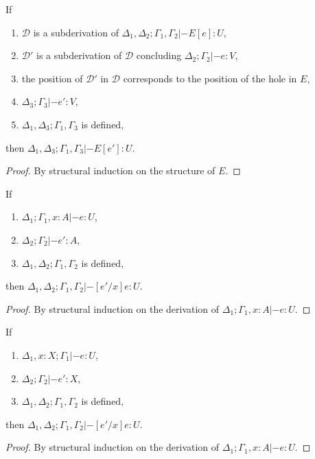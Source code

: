\begin{lemma}
  If
  \begin{enumerate}
  \item $\mathcal{D}$ is a subderivation of $\Delta_1,\Delta_2;\Gamma_1,\Gamma_2 |- E[e] : U$,
  \item $\mathcal{D}'$ is a subderivation of $\mathcal{D}$ concluding $\Delta_2;
    \Gamma_2 |- e : V$,
  \item the position of $\mathcal{D}'$ in $\mathcal{D}$ corresponds to the
    position of the hole in $E$,
  \item $\Delta_3;\Gamma_3 |- e' : V$,
  \item $\Delta_1,\Delta_3;\Gamma_1,\Gamma_3$ is defined,
  \end{enumerate}
  then $\Delta_1,\Delta_3;\Gamma_1,\Gamma_3 |- E[e'] : U$.
  \begin{proof}
    By structural induction on the structure of $E$.
  \end{proof}  
\end{lemma}

\begin{lemma}
  If
  \begin{enumerate}
  \item $\Delta_1; \Gamma_1, x : A |- e : U$,
  \item $\Delta_2; \Gamma_2 |- e' : A$,
  \item $\Delta_1,\Delta_2 ; \Gamma_1,\Gamma_2$ is defined,
  \end{enumerate}
  then $\Delta_1,\Delta_2; \Gamma_1,\Gamma_2 |- [e'/x]e : U$.
  \begin{proof}
    By structural induction on the derivation of $\Delta_1; \Gamma_1, x : A |- e : U$.
  \end{proof}
\end{lemma}

\begin{lemma}
  If
  \begin{enumerate}
  \item $\Delta_1, x : X; \Gamma_1 |- e : U$,
  \item $\Delta_2; \Gamma_2 |- e' : X$,
  \item $\Delta_1,\Delta_2 ; \Gamma_1,\Gamma_2$ is defined,
  \end{enumerate}
  then $\Delta_1,\Delta_2; \Gamma_1,\Gamma_2 |- [e'/x]e : U$.
  \begin{proof}
    By structural induction on the derivation of $\Delta_1; \Gamma_1, x : A |- e : U$.
  \end{proof}
\end{lemma}

